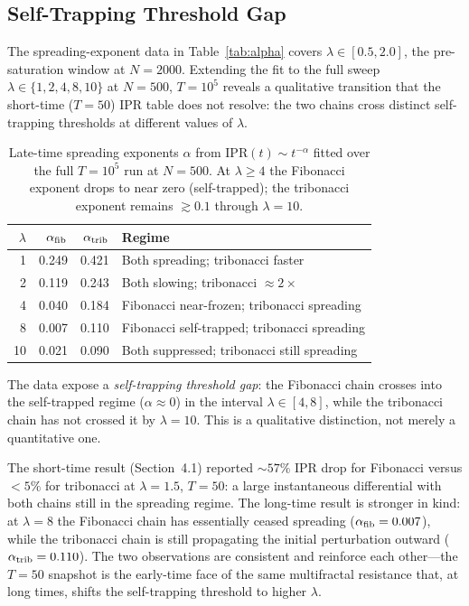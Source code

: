 
\subsection{Self-Trapping Threshold Gap}
\label{sec:self_trapping}

The spreading-exponent data in Table~\ref{tab:alpha} covers
$\lambda \in [0.5, 2.0]$, the pre-saturation window at $N=2000$.
Extending the fit to the full sweep $\lambda \in \{1, 2, 4, 8, 10\}$
at $N=500$, $T=10^5$ reveals a qualitative transition that the short-time
($T=50$) IPR table does not resolve: the two chains cross distinct
self-trapping thresholds at different values of $\lambda$.

\begin{table}[h]
\centering
\caption{Late-time spreading exponents $\alpha$ from
$\mathrm{IPR}(t) \sim t^{-\alpha}$ fitted over the full $T=10^5$ run at
$N=500$. At $\lambda \geq 4$ the Fibonacci exponent drops to near zero
(self-trapped); the tribonacci exponent remains $\gtrsim 0.1$ through
$\lambda = 10$.}
\label{tab:alpha_full}
\begin{tabular}{r r r l}
\toprule
$\lambda$ & $\alpha_{\rm fib}$ & $\alpha_{\rm trib}$ & Regime \\
\midrule
1  & 0.249 & 0.421 & Both spreading; tribonacci faster \\
2  & 0.119 & 0.243 & Both slowing; tribonacci $\approx 2\times$ \\
4  & 0.040 & 0.184 & Fibonacci near-frozen; tribonacci spreading \\
8  & 0.007 & 0.110 & Fibonacci self-trapped; tribonacci spreading \\
10 & 0.021 & 0.090 & Both suppressed; tribonacci still spreading \\
\bottomrule
\end{tabular}
\end{table}

The data expose a \emph{self-trapping threshold gap}: the Fibonacci chain
crosses into the self-trapped regime ($\alpha \approx 0$) in the interval
$\lambda \in [4, 8]$, while the tribonacci chain has not crossed it by
$\lambda = 10$. This is a qualitative distinction, not merely a
quantitative one.

The short-time result (Section~4.1) reported $\sim\!57\%$ IPR drop for
Fibonacci versus $<\!5\%$ for tribonacci at $\lambda=1.5$, $T=50$: a
large instantaneous differential with both chains still in the spreading
regime. The long-time result is stronger in kind: at $\lambda = 8$ the
Fibonacci chain has essentially ceased spreading
($\alpha_{\rm fib} = 0.007$), while the tribonacci chain is still
propagating the initial perturbation outward
($\alpha_{\rm trib} = 0.110$). The two observations are consistent and
reinforce each other---the $T=50$ snapshot is the early-time face of the
same multifractal resistance that, at long times, shifts the self-trapping
threshold to higher $\lambda$.

